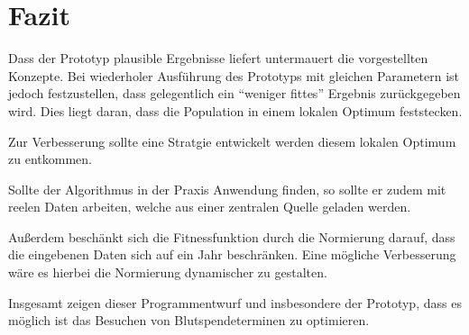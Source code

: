 \section{Fazit}\label{sec:fazit}
Dass der Prototyp plausible Ergebnisse liefert untermauert die vorgestellten Konzepte.
Bei wiederholer Ausführung des Prototyps mit gleichen Parametern ist jedoch festzustellen,
dass gelegentlich ein \enquote{weniger fittes} Ergebnis zurückgegeben wird.
Dies liegt daran, dass die Population in einem lokalen Optimum feststecken.

Zur Verbesserung sollte eine Stratgie entwickelt werden diesem lokalen Optimum zu entkommen.

Sollte der Algorithmus in der Praxis Anwendung finden,
so sollte er zudem mit reelen Daten arbeiten, welche aus einer zentralen Quelle geladen werden.

Außerdem beschänkt sich die Fitnessfunktion durch die Normierung darauf,
dass die eingebenen Daten sich auf ein Jahr beschränken.
Eine mögliche Verbesserung wäre es hierbei die Normierung dynamischer zu gestalten.

Insgesamt zeigen dieser Programmentwurf und insbesondere der Prototyp,
dass es möglich ist das Besuchen von Blutspendeterminen zu optimieren.